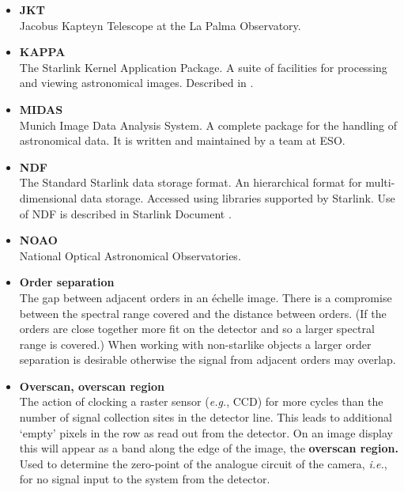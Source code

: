 {{\begin{itemize}
\item {\bf\label{gl_jkt}JKT}\\
      Jacobus Kapteyn Telescope at the La Palma Observatory.

\item {\bf\label{gl_kappa}KAPPA}\\
      The Starlink Kernel Application Package.  A suite of facilities
      for processing and viewing astronomical images.
      Described in .

\item {\bf\label{gl_midas}MIDAS}\\
      Munich Image Data Analysis System.  A complete package for the
      handling of astronomical data.
      It is written and maintained by a team at ESO.

\item {\bf\label{gl_ndf}NDF}\\
      The Standard Starlink data storage format.  An hierarchical format for
      multi-dimensional data storage.  Accessed using libraries supported
      by Starlink.  Use of NDF is described in Starlink Document
      \cite{ndf}.

\item {\bf\label{gl_noao}NOAO}\\
      National Optical Astronomical Observatories.

\item {\bf\label{gl_order_separation}Order separation}\\
      The gap between adjacent orders in an \'{e}chelle image.
      There is a compromise between the spectral range covered and the
      distance between orders.  (If the orders are close together more fit
      on the detector and so a larger spectral range is covered.)
      When working with non-starlike objects a larger order separation
      is desirable otherwise the signal from adjacent orders may overlap.

\item {\bf\label{gl_overscan}Overscan, overscan region}\\
      The action of clocking a raster sensor ({\em{e.g.}}, CCD) for more
      cycles than the number of signal collection sites in the
      detector line.  This leads to additional `empty' pixels in the
      row as read out from the detector.  On an image display this
      will appear as a band along the edge of the image, the {\bf
      overscan region.}  Used to determine the zero-point of the
      analogue circuit of the camera, {\em i.e.}, for no signal input
      to the system from the detector.


\end{itemize}}}
